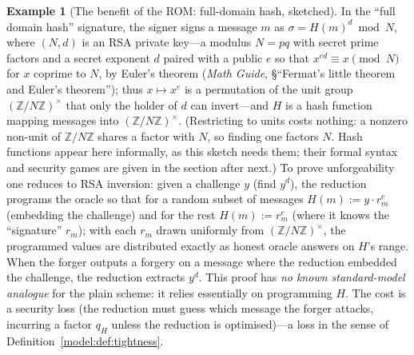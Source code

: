 \documentclass[11pt,a4paper]{article}
\theoremstyle{definition}
\newtheorem{example}[theorem]{Example}
\theoremstyle{remark}
\newcommand{\Z}{\ensuremath{\mathbb{Z}}}
\begin{document}
\begin{example}[The benefit of the ROM: full-domain hash, sketched]
\label{model:exp:rom-fdh}
In the ``full domain hash'' signature, the signer signs a message
\(m\) as \(\sigma = H(m)^{d} \bmod N\), where \((N,d)\) is an RSA
private key---a modulus \(N = pq\) with secret prime factors and a
secret exponent \(d\) paired with a public \(e\) so that
\(x^{ed} \equiv x \pmod N\) for \(x\) coprime to \(N\), by Euler's
theorem (\emph{Math Guide}, \S``Fermat's little theorem and Euler's
theorem''); thus \(x \mapsto x^{e}\) is a permutation of the unit
group \((\Z/N\Z)^\times\) that only the holder of \(d\) can
invert---and \(H\) is a hash function mapping messages into
\((\Z/N\Z)^\times\). (Restricting to units costs nothing: a nonzero
non-unit of \(\Z/N\Z\) shares a factor with \(N\), so finding one
factors \(N\). Hash functions appear here informally, as this sketch
needs them; their formal syntax and security games are given in the
section after next.) To prove unforgeability one
reduces to RSA inversion: given a challenge \(y\) (find \(y^{d}\)),
the reduction programs the oracle so that for a random subset of
messages \(H(m) := y \cdot r_m^{e}\) (embedding the challenge) and for
the rest \(H(m) := r_m^{e}\) (where it knows the ``signature''
\(r_m\)); with each \(r_m\) drawn uniformly from
\((\Z/N\Z)^\times\), the programmed values are distributed exactly as
honest oracle answers on \(H\)'s range. When the forger outputs a
forgery on a message where the
reduction embedded the challenge, the reduction extracts \(y^{d}\).
This proof has \emph{no known standard-model analogue} for the plain
scheme: it relies essentially on programming \(H\). The cost is a
security loss (the reduction must guess which message the forger
attacks, incurring a factor \(q_H\) unless the reduction is
optimised)---a loss in the sense of
Definition~\ref{model:def:tightness}.
\end{example}
\end{document}
